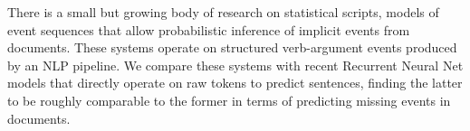 There is a small but growing body of research on statistical scripts, models of event sequences that allow probabilistic inference of implicit events from documents. These systems operate on structured verb-argument events produced by an NLP pipeline. We compare these systems with recent Recurrent Neural Net models that directly operate on raw tokens to predict sentences, finding the latter to be roughly comparable to the former in terms of predicting missing events in documents.
